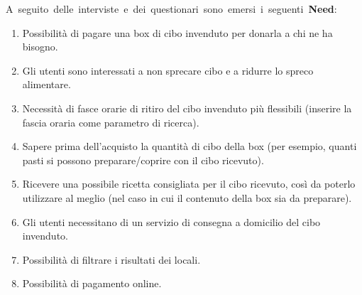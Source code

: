 \documentclass{article}
\begin{document}
\hbox{A seguito delle interviste e dei questionari sono emersi i seguenti \textbf{Need}:}
\begin{enumerate}[label=\textbf{Need-\arabic*}]
    \item Possibilità di pagare una box di cibo invenduto per donarla a chi ne ha bisogno. \label{need1}
    \item Gli utenti sono interessati a non sprecare cibo e a ridurre lo spreco alimentare. \label{need2}
    \item Necessità di fasce orarie di ritiro del cibo invenduto più flessibili (inserire la fascia oraria come parametro di ricerca). \label{need3}
    \item Sapere prima dell'acquisto la quantità di cibo della box (per esempio, quanti pasti si possono preparare/coprire con il cibo ricevuto). \label{need4}
    \item Ricevere una possibile ricetta consigliata per il cibo ricevuto, così da poterlo utilizzare al meglio (nel caso in cui il contenuto della box sia da preparare). \label{need5}
    \item Gli utenti necessitano di un servizio di consegna a domicilio del cibo invenduto. \label{need6}
    \item Possibilità di filtrare i risultati dei locali. \label{need7}
    \item Possibilità di pagamento online. \label{need8}
\end{enumerate}



\newpage
\end{document}
